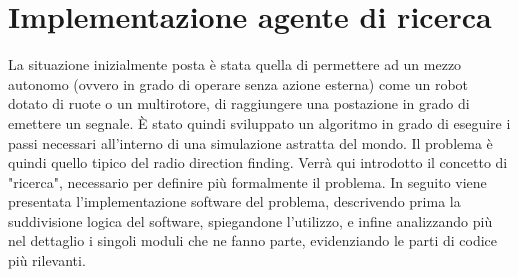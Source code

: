 \chapter{Implementazione agente di ricerca}
La situazione inizialmente posta è stata quella di permettere ad un mezzo autonomo (ovvero in grado di operare senza azione esterna) come un robot dotato di ruote o un multirotore, di raggiungere una postazione in grado di emettere un segnale. È stato quindi sviluppato un algoritmo in grado di eseguire i passi necessari all'interno di una simulazione astratta del mondo. Il problema è quindi quello tipico del radio direction finding. Verrà qui introdotto il concetto di "ricerca", necessario per definire più formalmente il problema. In seguito viene presentata l'implementazione software del problema, descrivendo prima la suddivisione logica del software, spiegandone l'utilizzo, e infine analizzando più nel dettaglio i singoli moduli che ne fanno parte, evidenziando le parti di codice più rilevanti.

